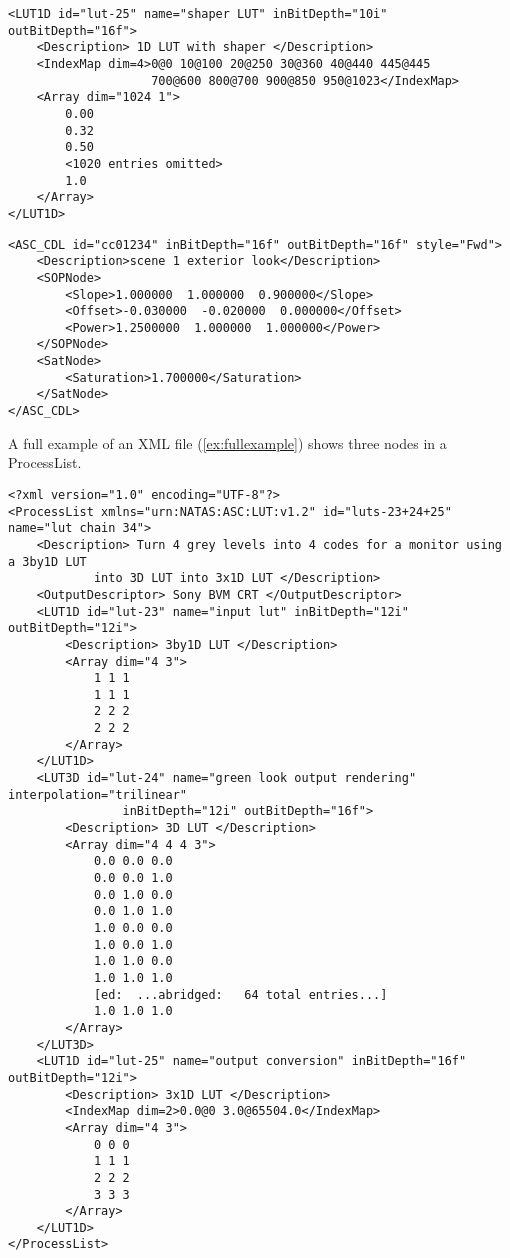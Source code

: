 \begin{lstlisting}[caption=Example of a partially enumerated ``Shaper LUT'',label=ex:shaperlut]
<LUT1D id="lut-25" name="shaper LUT" inBitDepth="10i" outBitDepth="16f">
	<Description> 1D LUT with shaper </Description>
	<IndexMap dim=4>0@0 10@100 20@250 30@360 40@440 445@445 
					700@600 800@700 900@850 950@1023</IndexMap>
	<Array dim="1024 1">
		0.00
		0.32
		0.50
		<1020 entries omitted>
		1.0
	</Array>
</LUT1D>
\end{lstlisting}

\begin{lstlisting}[caption=Example of an ASC CDL node,label=ex:asccdl]
<ASC_CDL id="cc01234" inBitDepth="16f" outBitDepth="16f" style="Fwd">
	<Description>scene 1 exterior look</Description>
	<SOPNode>
		<Slope>1.000000  1.000000  0.900000</Slope>
		<Offset>-0.030000  -0.020000  0.000000</Offset>
		<Power>1.2500000  1.000000  1.000000</Power>
	</SOPNode>
	<SatNode>
		<Saturation>1.700000</Saturation>
	</SatNode>
</ASC_CDL>

\end{lstlisting}

A full example of an XML file (\autoref{ex:fullexample}) shows three nodes in a ProcessList.

\begin{lstlisting}[caption=Full example of an XML LUT file,label=ex:fullexample]
<?xml version="1.0" encoding="UTF-8"?>
<ProcessList xmlns="urn:NATAS:ASC:LUT:v1.2" id="luts-23+24+25" name="lut chain 34">
	<Description> Turn 4 grey levels into 4 codes for a monitor using a 3by1D LUT 
			into 3D LUT into 3x1D LUT </Description>
	<OutputDescriptor> Sony BVM CRT </OutputDescriptor>
	<LUT1D id="lut-23" name="input lut" inBitDepth="12i" outBitDepth="12i">
		<Description> 3by1D LUT </Description>
		<Array dim="4 3">
			1 1 1
			1 1 1
			2 2 2 
			2 2 2
		</Array>
	</LUT1D>
	<LUT3D id="lut-24" name="green look output rendering" interpolation="trilinear"
				inBitDepth="12i" outBitDepth="16f">
		<Description> 3D LUT </Description>
		<Array dim="4 4 4 3">
			0.0 0.0 0.0
			0.0 0.0 1.0
			0.0 1.0 0.0
			0.0 1.0 1.0
			1.0 0.0 0.0
			1.0 0.0 1.0
			1.0 1.0 0.0
			1.0 1.0 1.0
			[ed:  ...abridged:   64 total entries...]
			1.0 1.0 1.0
		</Array>
	</LUT3D>
	<LUT1D id="lut-25" name="output conversion" inBitDepth="16f" outBitDepth="12i">
		<Description> 3x1D LUT </Description>
		<IndexMap dim=2>0.0@0 3.0@65504.0</IndexMap>
		<Array dim="4 3">
			0 0 0 
			1 1 1
			2 2 2 
			3 3 3
		</Array>
	</LUT1D>
</ProcessList>

\end{lstlisting}

